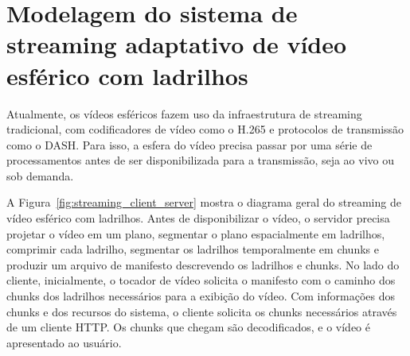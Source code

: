 


\chapter{Modelagem do sistema de streaming adaptativo de vídeo esférico com ladrilhos}\label{Cap:Problem Design}

Atualmente, os vídeos esféricos fazem uso da infraestrutura de streaming tradicional, com codificadores de vídeo como o H.265 e protocolos de transmissão como o DASH. Para isso, a esfera do vídeo precisa passar por uma série de processamentos antes de ser disponibilizada para a transmissão, seja ao vivo ou sob demanda.

A Figura~\ref{fig:streaming_client_server} mostra o diagrama geral do streaming de vídeo esférico com ladrilhos. Antes de disponibilizar o vídeo, o servidor precisa projetar o vídeo em um plano, segmentar o plano espacialmente em ladrilhos, comprimir cada ladrilho, segmentar os ladrilhos temporalmente em chunks e produzir um arquivo de manifesto descrevendo os ladrilhos e chunks. No lado do cliente, inicialmente, o tocador de vídeo solicita o manifesto com o caminho dos chunks dos ladrilhos necessários para a exibição do vídeo. Com informações dos chunks e dos recursos do sistema, o cliente solicita os chunks necessários através de um cliente HTTP. Os chunks que chegam são decodificados, e o vídeo é apresentado ao usuário.


